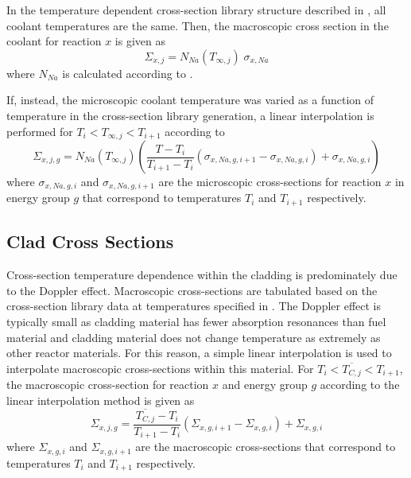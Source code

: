     In the temperature dependent cross-section library structure described in
    , all coolant temperatures are the same. 
    Then, the macroscopic cross section in the coolant for reaction $x$ is given
    as
    \begin{equation}
      \Sigma_{x,j} = N_{Na}(T_{\infty,j}) \; \sigma_{x,Na}
    \end{equation}
    where $N_{Na}$ is calculated according to .

    If, instead, the microscopic coolant temperature was varied as a function
    of temperature in the cross-section library generation, a linear 
    interpolation is performed for $T_{i}<T_{\infty,j}<T_{i+1}$ according to
    \begin{equation}
      \label{eq:cs_cool}
      \Sigma_{x,j,g} = N_{Na}(T_{\infty,j}) 
        \left( \frac{T - T_{i}}{T_{i+1}-T_{i}} 
        (\sigma_{x,Na,g,i+1} - \sigma_{x,Na,g,i})  + \sigma_{x,Na,g,i}\right)
    \end{equation}
    where $\sigma_{x,Na,g,i}$ and $\sigma_{x,Na,g,i+1}$ are the microscopic 
    cross-sections for reaction $x$ in energy group $g$ that correspond to 
    temperatures $T_i$ and $T_{i+1}$ respectively.

  \subsection{Clad Cross Sections}
    Cross-section temperature dependence within the cladding is predominately
    due to the Doppler effect. Macroscopic cross-sections are tabulated based 
    on the cross-section library data at temperatures specified in
    . The Doppler effect is typically small as cladding
    material has fewer absorption resonances than fuel material and cladding
    material does not change temperature as extremely as other reactor
    materials. For this reason, a simple linear interpolation is used to 
    interpolate macroscopic cross-sections within this material. For 
    $T_i < \overline{T_{C,j}} < T_{i+1}$, the macroscopic cross-section for 
    reaction $x$ and energy group $g$ according to the linear interpolation 
    method is given as
    \begin{equation}
      \label{eq:xs_linear_interpolation}
      \Sigma_{x,j,g} = 
        \frac{\overline{T_{C,j}} - T_{i}}{T_{i+1}-T_{i}} 
        (\Sigma_{x,g,i+1} - \Sigma_{x,g,i})  + \Sigma_{x,g,i}
    \end{equation}
    where $\Sigma_{x,g,i}$ and $\Sigma_{x,g,i+1}$ are the macroscopic
    cross-sections that correspond to temperatures $T_i$ and $T_{i+1}$
    respectively. 

